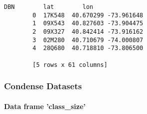 \documentclass[11pt]{article}
\begin{document}
\begin{Verbatim}[commandchars=\\\{\}]
              DBN        lat        lon  
        0  17K548  40.670299 -73.961648  
        1  09X543  40.827603 -73.904475  
        2  09X327  40.842414 -73.916162  
        3  02M280  40.710679 -74.000807  
        4  28Q680  40.718810 -73.806500  
        
        [5 rows x 61 columns]
\end{Verbatim}
            
    \subsubsection{Condense Datasets}\label{condense-datasets}

    \paragraph{Data frame 'class\_size'}\label{data-frame-class_size}
\end{document}
